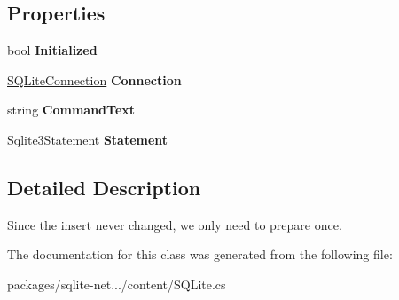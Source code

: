 \subsection*{Properties}
\begin{DoxyCompactItemize}
\item 
\hypertarget{classSQLite_1_1PreparedSqlLiteInsertCommand_a9bc93418687042e4ee5b0fde8291b388}{}bool {\bfseries Initialized}\label{classSQLite_1_1PreparedSqlLiteInsertCommand_a9bc93418687042e4ee5b0fde8291b388}

\item 
\hypertarget{classSQLite_1_1PreparedSqlLiteInsertCommand_aef54b0acba4b83045e5e5fa17286bb27}{}\hyperlink{classSQLite_1_1SQLiteConnection}{S\+Q\+Lite\+Connection} {\bfseries Connection}\label{classSQLite_1_1PreparedSqlLiteInsertCommand_aef54b0acba4b83045e5e5fa17286bb27}

\item 
\hypertarget{classSQLite_1_1PreparedSqlLiteInsertCommand_a435ce4bcdc122f2f5b6b96a7d89b3a29}{}string {\bfseries Command\+Text}\label{classSQLite_1_1PreparedSqlLiteInsertCommand_a435ce4bcdc122f2f5b6b96a7d89b3a29}

\item 
\hypertarget{classSQLite_1_1PreparedSqlLiteInsertCommand_a5b8cfa2ccca99c02f38538be5d089c2d}{}Sqlite3\+Statement {\bfseries Statement}\label{classSQLite_1_1PreparedSqlLiteInsertCommand_a5b8cfa2ccca99c02f38538be5d089c2d}

\end{DoxyCompactItemize}


\subsection{Detailed Description}
Since the insert never changed, we only need to prepare once. 



The documentation for this class was generated from the following file\+:\begin{DoxyCompactItemize}
\item 
packages/sqlite-\/net.../content/S\+Q\+Lite.\+cs\end{DoxyCompactItemize}
